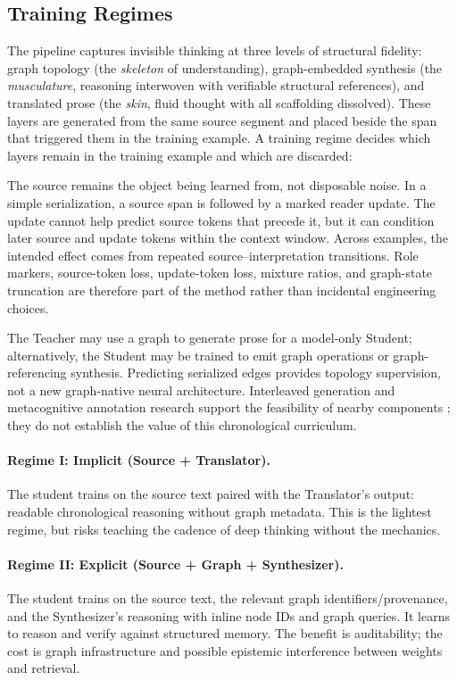 \subsection{Training Regimes}\label{sec:training-regimes}

The pipeline captures invisible thinking at three levels of structural
fidelity: graph topology (the \emph{skeleton} of understanding),
graph-embedded synthesis (the \emph{musculature}, reasoning interwoven with
verifiable structural references), and translated prose (the \emph{skin},
fluid thought with all scaffolding dissolved). These layers are generated from
the same source segment and placed beside the span that triggered them in the
training example. A training regime decides which layers remain in the
training example and which are discarded:

The source remains the object being learned from, not disposable noise. In a
simple serialization, a source span is followed by a marked reader update. The
update cannot help predict source tokens that precede it, but it can condition
later source and update tokens within the context window. Across examples, the
intended effect comes from repeated source--interpretation transitions. Role
markers, source-token loss, update-token loss, mixture ratios, and graph-state
truncation are therefore part of the method rather than incidental engineering
choices.

The Teacher may use a graph to generate prose for a model-only Student;
alternatively, the Student may be trained to emit graph operations or
graph-referencing synthesis. Predicting serialized edges provides topology
supervision, not a new graph-native neural architecture. Interleaved generation
and metacognitive annotation research support the feasibility of nearby
components \cite{xie2025interleaved,didolkar2024metacognitive,korbak2023pretraining};
they do not establish the value of this chronological curriculum.

\paragraph{Regime I: Implicit (Source + Translator).} The student trains on the
source text paired with the Translator's output: readable chronological
reasoning without graph metadata. This is the lightest regime, but risks
teaching the cadence of deep thinking without the mechanics.

\paragraph{Regime II: Explicit (Source + Graph + Synthesizer).} The student
trains on the source text, the relevant graph identifiers/provenance, and the
Synthesizer's reasoning with inline node IDs and graph queries. It learns to
reason and verify against structured memory. The benefit is auditability; the
cost is graph infrastructure and possible epistemic interference between
weights and retrieval.


